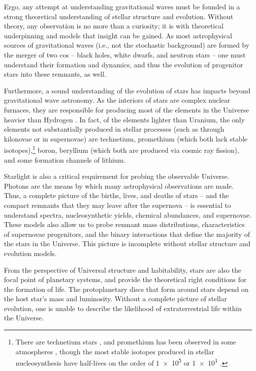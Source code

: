 Ergo, any attempt at understanding gravitational waves must be founded in a strong theoretical understanding of stellar structure and evolution. Without theory, any observation is no more than a curiosity; it is with theoretical underpinning and models that insight can be gained. As most astrophysical sources of gravitational waves (i.e., not the stochastic background) are formed by the merger of two \glspl{co} -- black holes, white dwarfs, and neutron stars -- one must understand their formation and dynamics, and thus the evolution of progenitor stars into these remnants, as well.

Furthermore, a sound understanding of the evolution of stars has impacts beyond gravitational wave astronomy. As the interiors of stars are complex nuclear furnaces, they are responsible for producing most of the elements in the Universe heavier than Hydrogen \citep{Burbidge:1957}. In fact, of the elements lighter than Uranium, the only elements not substantially produced in stellar processes (such as through kilonovae or in supernovae) are technetium, promethium (which both lack stable isotopes),\footnote{There are technetium stars \citep[][among others]{Merrill:1952, Smith:1988, Uttenthaler:2010}, and promethium has been observed in some atmospheres \citep{Cowley:2004}, though the most stable isotopes produced in stellar nucleosynthesis have half-lives on the order of \SI[print-unity-mantissa=false]{1e5}{\year} \citep[Tc; ][]{Uttenthaler:2010} or \SI[print-unity-mantissa=false]{1e1}{\year} \citep[Pm; ][]{Cowley:2004}.} boron, beryllium (which both are produced via cosmic ray fission), and some formation channels of lithium.

Starlight is also a critical requirement for probing the observable Universe. Photons are the means by which many astrophysical observations are made. Thus, a complete picture of the births, lives, and deaths of stars -- and the compact remnants that they may leave after the supernova -- is essential to understand spectra, nucleosynthetic yields, chemical abundances, and supernovae. These models also allow us to probe remnant mass distributions, characteristics of supernovae progenitors, and the binary interactions that define the majority of the stars in the Universe. This picture is incomplete without stellar structure and evolution models.

From the perspective of Universal structure and habitability, stars are also the focal point of planetary systems, and provide the theoretical right conditions for the formation of life. The protoplanetary discs that form around stars depend on the host star's mass and luminosity. Without a complete picture of stellar evolution, one is unable to describe the likelihood of extraterrestrial life within the Universe.

